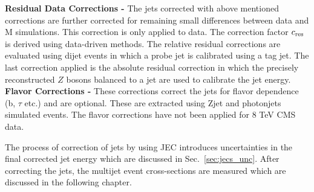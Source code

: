 {\bf Residual Data Corrections -} The jets corrected with above mentioned corrections are further corrected for remaining small differences between data and M simulations. This correction is only applied to data. The correction factor $c_{\rm res}$ is derived using data-driven methods. The relative residual corrections are evaluated using dijet events in which a probe jet is calibrated using a tag jet. The last correction applied is the absolute residual correction in which the precisely reconstructed $Z$ bosons balanced to a jet are used to calibrate the jet energy. \\ \newline
{\bf Flavor Corrections -} These corrections correct the jets for flavor dependence (b, $\tau$ etc.) and are optional. These are extracted using Z\plusn jet and photon\plusn jets simulated events. The flavor corrections have not been applied for 8 TeV CMS data.

The process of correction of jets by using JEC introduces uncertainties in the final corrected jet energy which are discussed in Sec.~\ref{sec:jecs_unc}. After correcting the jets, the multijet event cross-sections are measured which are discussed in the following chapter.
